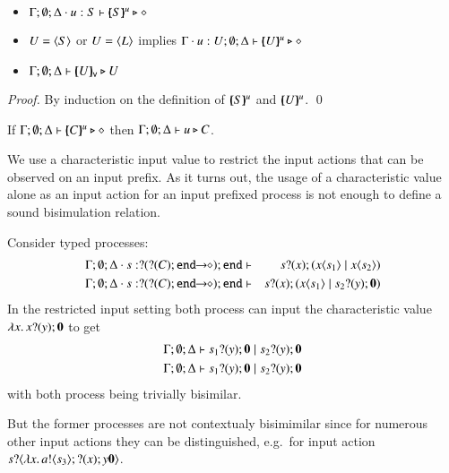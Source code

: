 \begin{proposition}\rm
$ $
	\begin{itemize}
		\item	$\Gamma; \emptyset; \Delta \cdot u:S \vdash [\!\!(S)\!\!]^{u} \triangleright \diamond$
		\item	$U = \langle S \rangle$ or $U = \langle L \rangle$ implies $\Gamma \cdot u:U; \emptyset; \Delta \vdash [\!\!(U)\!\!]^{u} \triangleright \diamond$
		\item	$\Gamma; \emptyset; \Delta \vdash [\!\!(U)\!\!]_{\mathsf{v}} \triangleright U$
	\end{itemize}
\end{proposition}

\begin{proof}
	By induction on the definition of $[\!\!(S)\!\!]^{u}$ and $[\!\!(U)\!\!]^{u}$.
	\qed
\end{proof}

\begin{corollary}\rm
	If $\Gamma; \emptyset; \Delta \vdash [\!\!(C)\!\!]^{u} \triangleright \diamond$
	then
	$\Gamma; \emptyset; \Delta \vdash u \triangleright C$.
\end{corollary}

We use a characteristic input value to restrict the input actions that 
can be observed on an input prefix.
%
As it turns out, the usage of a characteristic value
alone as an input action for an input prefixed process
is not enough to define a sound bisimulation relation.
%
\begin{example}
	\label{ex:char_proc}
	Consider typed processes:
	\begin{eqnarray*}
		\Gamma; \es; \Delta \cat s: \btinp{\shot{\btinp{C} \tinact}} \tinact &\proves& \binp{s}{x} (\appl{x}{s_1} \Par \appl{x}{s_2})\\
		\Gamma; \es; \Delta \cat s: \btinp{\shot{\btinp{C} \tinact}} \tinact &\proves& \binp{s}{x} (\appl{x}{s_1} \Par \binp{s_2}{y} \inact)
	\end{eqnarray*}
	In the restricted input setting both process can input the
	characteristic value $\lambda x.\,x ? (y) ; \mathbf{0}$
	to get
	\begin{eqnarray*}
		\Gamma; \emptyset; \Delta \vdash s_1 ? (y) ; \mathbf{0} \;|\; s_2 ? (y) ; \mathbf{0}\\
		\Gamma; \emptyset; \Delta \vdash s_1 ? (y) ; \mathbf{0} \;|\; s_2 ? (y) ; \mathbf{0}
	\end{eqnarray*}
	with both process being trivially bisimilar.

	But the former processes are not contextualy bisimimilar since
	for numerous other input actions they can be distinguished,
	e.g.~for input action $s ? \langle \lambda x.\,a ! \langle s_3 \rangle ; ? (x) ;{y} \mathbf{0} \rangle$.
\end{example}

